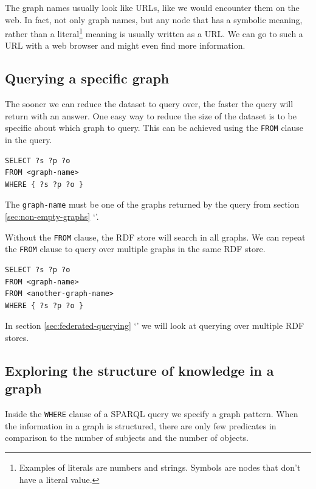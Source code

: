 \documentclass[11pt,a4paper,oneside]{book}
\begin{document}
  The graph names usually look like URLs, like we would encounter them on the
  web.  In fact, not only graph names, but any node that has a symbolic meaning,
  rather than a literal\footnote{Examples of literals are numbers and strings.
    Symbols are nodes that don't have a literal value.} meaning is usually
  written as a URL.  We can go to such a URL with a web browser and might even
  find more information.

\subsection{Querying a specific graph}

  The sooner we can reduce the dataset to query over, the faster the query will
  return with an answer.  One easy way to reduce the size of the dataset is to
  be specific about which graph to query.  This can be achieved using the
  \texttt{FROM} clause in the query.

\begin{siderules}
\begin{verbatim}
SELECT ?s ?p ?o
FROM <graph-name>
WHERE { ?s ?p ?o }
\end{verbatim}
\end{siderules}

  The \texttt{graph-name} must be one of the graphs returned by the query from
  section \ref{sec:non-empty-graphs} {\color{LinkGray}%
    `'}.

  Without the \texttt{FROM} clause, the RDF store will search in all graphs.
  We can repeat the \texttt{FROM} clause to query over multiple graphs in the
  same RDF store.

\begin{siderules}
\begin{verbatim}
SELECT ?s ?p ?o
FROM <graph-name>
FROM <another-graph-name>
WHERE { ?s ?p ?o }
\end{verbatim}
\end{siderules}

  In section \ref{sec:federated-querying} {\color{LinkGray}%
  `'} we will look at querying over multiple
  RDF stores.

\subsection{Exploring the structure of knowledge in a graph}


  Inside the \texttt{WHERE} clause of a SPARQL query we specify a graph
  pattern.  When the information in a graph is structured, there are only few
  predicates in comparison to the number of subjects and the number of objects.
\end{document}
